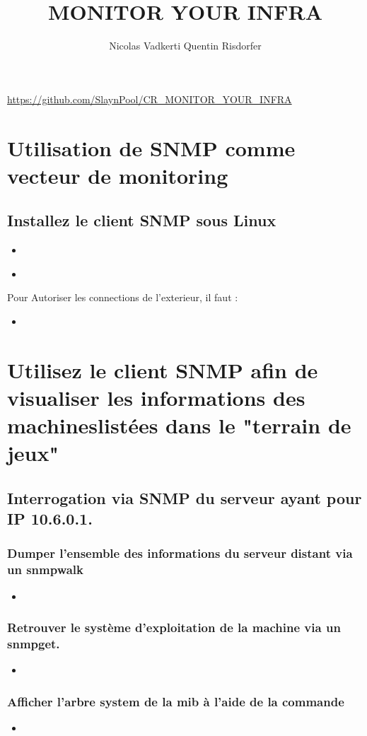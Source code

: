 \documentclass[10pt,a4paper]{article}
\title{MONITOR YOUR INFRA}
\author{Nicolas Vadkerti Quentin Risdorfer}
\newcommand{\insertcode}[2]{\begin{itemize}\item[]\end{itemize}}
\begin{document}
\maketitle


\url{https://github.com/SlaynPool/CR_MONITOR_YOUR_INFRA}



\section{Utilisation de SNMP comme vecteur de monitoring}
\subsection{Installez le client SNMP sous Linux}

\insertcode{commande/1.txt}{Installation d'un Client}

\insertcode{commande/2.txt}{Test d'interogation}

Pour Autoriser les connections de l'exterieur, il faut :

\insertcode{commande/3.txt}{snmpd.conf}

\section{Utilisez le client SNMP afin de visualiser les informations des machineslistées dans le "terrain de jeux"}
\subsection{Interrogation via SNMP du serveur ayant pour IP 10.6.0.1.}
\subsubsection{Dumper l’ensemble des informations du serveur distant via un snmpwalk}
\insertcode{commande/4.txt}{snmpwalk}

\subsubsection{Retrouver le système d’exploitation de la machine via un snmpget.}
\insertcode{commande/5.txt}{snmpget}

\subsubsection{Afficher l’arbre system de la mib à l’aide de la commande }
\insertcode{commande/6.txt}{Arbre de la mib SNMPv2}
\end{document}
